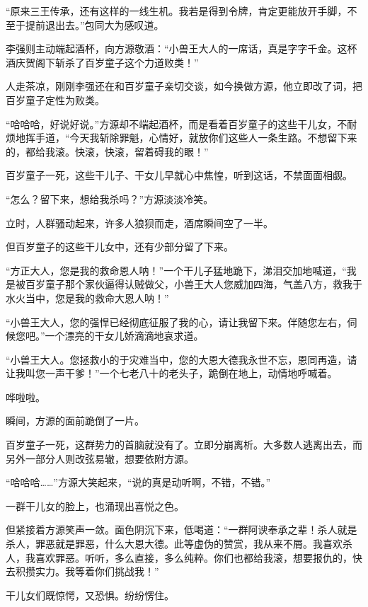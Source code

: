
\begin{this_body}

“原来三王传承，还有这样的一线生机。我若是得到令牌，肯定更能放开手脚，不至于提前退出去。”包同大为感叹道。

李强则主动端起酒杯，向方源敬酒：“小兽王大人的一席话，真是字字千金。这杯酒庆贺阁下斩杀了百岁童子这个力道败类！”

人走茶凉，刚刚李强还在和百岁童子亲切交谈，如今换做方源，他立即改了词，把百岁童子定性为败类。

“哈哈哈，好说好说。”方源却不端起酒杯，而是看着百岁童子的这些干儿女，不耐烦地挥手道，“今天我斩除罪魁，心情好，就放你们这些人一条生路。不想留下来的，都给我滚。快滚，快滚，留着碍我的眼！”

百岁童子一死，这些干儿子、干女儿早就心中焦惶，听到这话，不禁面面相觑。

“怎么？留下来，想给我杀吗？”方源淡淡冷笑。

立时，人群骚动起来，许多人狼狈而走，酒席瞬间空了一半。

但百岁童子的这些干儿女中，还有少部分留了下来。

“方正大人，您是我的救命恩人呐！”一个干儿子猛地跪下，涕泪交加地喊道，“我是被百岁童子那个家伙逼得认贼做父，小兽王大人您威加四海，气盖八方，救我于水火当中，您是我的救命大恩人呐！”

“小兽王大人，您的强悍已经彻底征服了我的心，请让我留下来。伴随您左右，伺候您吧。”一个漂亮的干女儿娇滴滴地哀求道。

“小兽王大人。您拯救小的于灾难当中，您的大恩大德我永世不忘，恩同再造，请让我叫您一声干爹！”一个七老八十的老头子，跪倒在地上，动情地呼喊着。

哗啦啦。

瞬间，方源的面前跪倒了一片。

百岁童子一死，这群势力的首脑就没有了。立即分崩离析。大多数人逃离出去，而另外一部分人则改弦易辙，想要依附方源。

“哈哈哈……”方源大笑起来，“说的真是动听啊，不错，不错。”

一群干儿女的脸上，也涌现出喜悦之色。

但紧接着方源笑声一敛。面色阴沉下来，低喝道：“一群阿谀奉承之辈！杀人就是杀人，罪恶就是罪恶，什么大恩大德。此等虚伪的赞赏，我从来不屑。我喜欢杀人，我喜欢罪恶。听听，多么直接，多么纯粹。你们也都给我滚，想要报仇的，快去积攒实力。我等着你们挑战我！”

干儿女们既惊愕，又恐惧。纷纷愣住。


\end{this_body}
